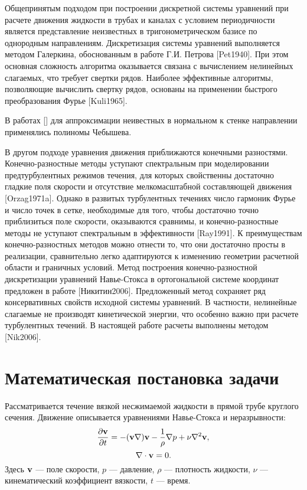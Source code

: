 Общепринятым подходом при построении дискретной системы уравнений при расчете движения жидкости в трубах и каналах с условием периодичности является представление неизвестных в тригонометрическом базисе по однородным направлениям. Дискретизация системы уравнений выполняется методом Галеркина, обоснованным в работе Г.И. Петрова [Pet1940]. При этом основная сложность алгоритма оказывается связана с вычислением нелинейных слагаемых, что требует свертки рядов. Наиболее эффективные алгоритмы, позволяющие вычислить свертку рядов, основаны на применении быстрого преобразования Фурье [Kuli1965]. 

В работах [] для аппроксимации неивестных в нормальном к стенке направлении применялись полиномы Чебышева. 

В другом подходе уравнения движения приближаются конечными разностями. Конечно-разностные методы уступают спектральным при моделировании предтурбулентных режимов течения, для которых свойственны достаточно гладкие поля скорости и отсутствие мелкомасштабной составляющей движения [Orzag1971a]. Однако в развитых турбулентных течениях число гармоник Фурье и число точек в сетке, необходимые для того, чтобы достаточно точно приблизиться поле скорости, оказываются сравнимы, и конечно-разностные методы не уступают спектральным в эффективности [Ray1991]. К преимуществам конечно-разностных методов можно отнести то, что они достаточно просты в реализации, сравнительно легко адаптируются к изменению геометрии расчетной области и граничных условий. Метод построения конечно-разностной дискретизации уравнений Навье-Стокса в ортогональной системе координат предложен в работе [Никитин2006]. Предложенный метод сохраняет ряд консервативных свойств исходной системы уравнений. В частности, нелинейные слагаемые не производят кинетической энергии, что особенно важно при расчете турбулентных течений. В настоящей работе расчеты выполнены методом [Nik2006]. 


\section{Математическая постановка задачи} \label{math_section}

Рассматривается течение вязкой несжимаемой жидкости в прямой трубе круглого сечения. Движение описывается уравнениями Навье-Стокса и неразрывности:
\begin{equation} \label{NS_eq}
\frac{\partial \mathbf{v}}{\partial t} = - (\mathbf{v} \nabla) \mathbf{v} - \frac{1}{\rho}\nabla p + \nu \nabla^2 \mathbf{v},
\end{equation}
\begin{equation} \label{div_eq}
\nabla \cdot \mathbf{v} = 0.
\end{equation}
Здесь $\mathbf{v}$ --- поле скорости, $p$ --- давление, $\rho$ --- плотность жидкости, $\nu$ --- кинематический коэффициент вязкости, $t$ --- время. 

